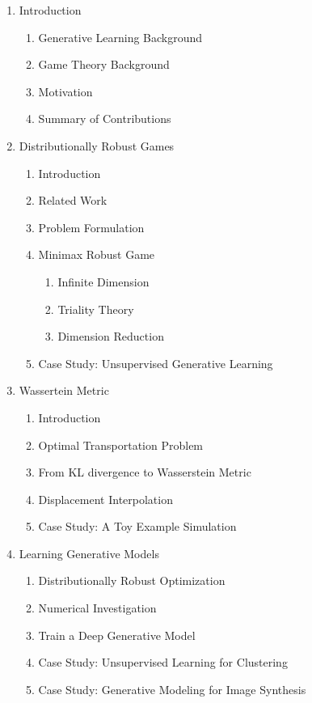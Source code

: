 \documentclass{article}
\begin{document}
\begin{enumerate}
	\item Introduction
    \begin{enumerate}
    	\item Generative Learning Background
        \item Game Theory Background
        \item Motivation
        \item Summary of Contributions
    \end{enumerate}
    
    \item Distributionally Robust Games
    \begin{enumerate}
    	\item Introduction
        \item Related Work
        \item Problem Formulation
        \item Minimax Robust Game
        \begin{enumerate}
            \item Infinite Dimension
            \item Triality Theory
            \item Dimension Reduction
        \end{enumerate}
        \item Case Study: Unsupervised Generative Learning
    \end{enumerate}
    
    \item Wassertein Metric
    \begin{enumerate}
    	\item Introduction
        \item Optimal Transportation Problem
        \item From KL divergence to Wasserstein Metric
        \item Displacement Interpolation
        \item Case Study: A Toy Example Simulation
    \end{enumerate}
    
    \item Learning Generative Models
    \begin{enumerate}
    	\item Distributionally Robust Optimization
        \item Numerical Investigation
        \item Train a Deep Generative Model
        \item Case Study: Unsupervised Learning for Clustering
        \item Case Study: Generative Modeling for Image Synthesis
    \end{enumerate}
    

\end{enumerate}
\end{document}
